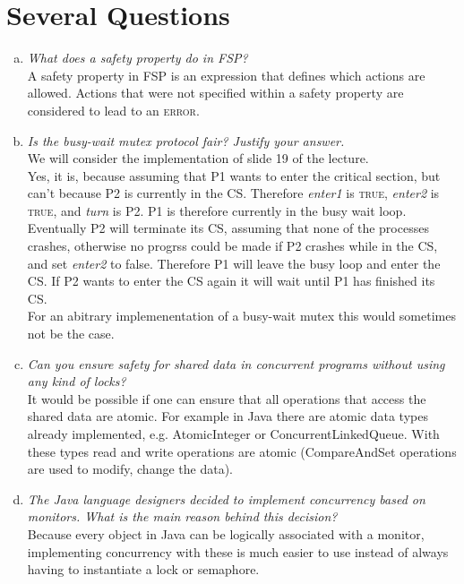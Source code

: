 \documentclass{report}
\author{Marcel \textsc{Zauder} 16-124-836 \\
	Pascal \textsc{Gerig} 16-104-721}
\begin{document}
	\section{Several Questions}
	\startsection
		\begin{enumerate}[a)]
			\item \textit{What does a safety property do in FSP?} \\
			A safety property in FSP is an expression that defines which actions are allowed. Actions that were not specified within a safety property are considered to lead to an \textsc{error}.
			\item \textit{Is the busy-wait mutex protocol fair? Justify your answer.} \\
			We will consider the implementation of slide 19 of the lecture. \\
			Yes, it is, because assuming that P1 wants to enter the critical section, but can't because P2 is currently in the CS. Therefore \textit{enter1} is \textsc{true}, \textit{enter2} is \textsc{true}, and \textit{turn} is P2. P1 is therefore currently in the busy wait loop. Eventually P2 will terminate its CS, assuming that none of the processes crashes, otherwise no progrss could be made if P2 crashes while in the CS, and set \textit{enter2} to false. Therefore P1 will leave the busy loop and enter the CS. If P2 wants to enter the CS again it will wait until P1 has finished its CS. \\
			For an abitrary implemenentation of a busy-wait mutex this would sometimes not be the case.
			\item \textit{Can you ensure safety for shared data in concurrent programs without using any kind of locks?} \\
			It would be possible if one can ensure that all operations that access the shared data are atomic. For example in Java there are atomic data types already implemented, e.g. AtomicInteger or ConcurrentLinkedQueue. With these types read and write operations are atomic (CompareAndSet operations are used to modify, change the data). 
			\item \textit{The Java language designers decided to implement concurrency based on monitors. What is the main reason behind this decision?} \\
			Because every object in Java can be logically associated with a monitor, implementing concurrency with these is much easier to use instead of always having to instantiate a lock or semaphore.
		\end{enumerate}
	\closesection
	
\end{document}
